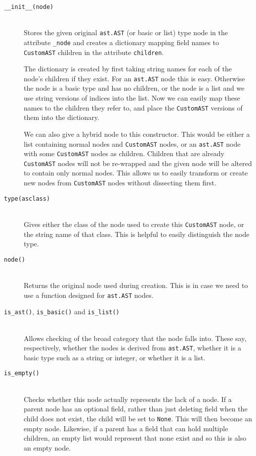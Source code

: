 \documentclass[twoside,a4paper]{report}
\begin{document}
\begin{description}
\item[\texttt{\_\_init\_\_(node)}] \hfill \\
Stores the given original \texttt{ast.AST} (or basic or list) type node in the attribute \texttt{\_node} and creates a dictionary mapping field names
to \texttt{CustomAST} children in the attribute \texttt{children}.

The dictionary is created by first taking string names for each of the node's children if they exist. For an \texttt{ast.AST} node this is easy.
Otherwise the node is a basic type and has no children, or the node is a list and we use string versions of indices into the list. Now we can
easily map these names to the children they refer to, and place the \texttt{CustomAST} versions of them into the dictionary.

We can also give a hybrid node to this constructor. This would be either a list containing normal nodes and \texttt{CustomAST} nodes, or an
\texttt{ast.AST} node with some \texttt{CustomAST} nodes as children. Children that are already \texttt{CustomAST} nodes will not be re-wrapped
and the given node will be altered to contain only normal nodes. This allows us to easily transform or create new nodes from \texttt{CustomAST}
nodes without dissecting them first.

\item[\texttt{type(asclass)}] \hfill \\
Gives either the class of the node used to create this \texttt{CustomAST} node, or the string name of that class. This is helpful to easily distinguish
the node type.

\item[\texttt{node()}] \hfill \\
Returns the original node used during creation. This is in case we need to use a function designed for \texttt{ast.AST} nodes.

\item[\texttt{is\_ast()}, \texttt{is\_basic()} and \texttt{is\_list()}] \hfill \\
Allows checking of the broad category that the node falls into. These say, respectively, whether the nodes is derived from \texttt{ast.AST}, whether
it is a basic type such as a string or integer, or whether it is a list.

\item[\texttt{is\_empty()}] \hfill \\
Checks whether this node actually represents the lack of a node. If a parent node has an optional field, rather than just deleting field when the child does
not exist, the child will be set to \texttt{None}. This will then become an empty node. Likewise, if a parent has a field that can hold multiple children, an
empty list would represent that none exist and so this is also an empty node.


\end{description}
\end{document}
